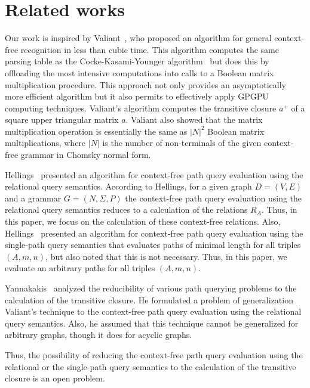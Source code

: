\section{Related works} \label{section_related}
Our work is inspired by Valiant~\cite{valiant}, who proposed an algorithm for general context-free recognition in less than cubic time. This algorithm computes the same parsing table as the Cocke-Kasami-Younger algorithm~\cite{kasami, younger} but does this by offloading the most intensive computations into calls to a Boolean matrix multiplication procedure. This approach not only provides an asymptotically more efficient algorithm but it also permits to effectively apply GPGPU computing techniques. Valiant's algorithm computes the transitive closure $a^+$ of a square upper triangular matrix $a$. Valiant also showed that the matrix multiplication operation is essentially the same as $|N|^2$ Boolean matrix multiplications, where $|N|$ is the number of non-terminals of the given context-free grammar in Chomsky normal form.

Hellings~\cite{hellingsRelational} presented an algorithm for context-free path query evaluation using the relational query semantics. According to Hellings, for a given graph $D = (V, E)$ and a grammar $G = (N, \Sigma, P)$ the context-free path query evaluation using the relational query semantics reduces to a calculation of the relations $R_A$. Thus, in this paper, we focus on the calculation of these context-free relations. Also, Hellings~\cite{hellingsRelational} presented an algorithm for context-free path query evaluation using the single-path query semantics that evaluates paths of minimal length for all triples $(A,m,n)$, but also noted that this is not necessary. Thus, in this paper, we evaluate an arbitrary paths for all triples $(A,m,n)$.

Yannakakis~\cite{transitive-closure} analyzed the reducibility of various path querying problems to the calculation of the transitive closure. He formulated a problem of generalization Valiant's technique to the context-free path query evaluation using the relational query semantics. Also, he assumed that this technique cannot be generalized for arbitrary graphs, though it does for acyclic graphs.

Thus, the possibility of reducing the context-free path query evaluation using the relational or the single-path query semantics to the calculation of the transitive closure is an open problem.